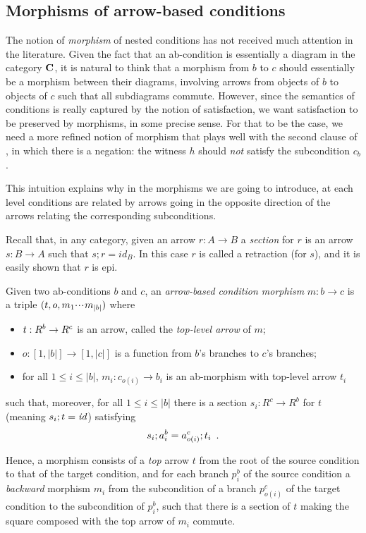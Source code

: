 \subsection{Morphisms of arrow-based conditions}

The notion of \emph{morphism} of nested conditions has not received much attention in the literature. Given the fact that an ab-condition is essentially a diagram in the category $\mathbf{C}$, it is natural to think that a morphism from $b$ to $c$ should essentially be a morphism between their diagrams, involving arrows from objects of $b$ to objects of $c$ such that all subdiagrams commute. However, since the semantics of conditions is really captured by the notion of satisfaction, we want satisfaction to be preserved by morphisms, in some precise sense. For that to be the case, we need a more refined notion of morphism that plays well with the second clause of , in which there is a negation: the witness $h$ should \emph{not} satisfy the subcondition $c_b$. 

This intuition explains why in the morphisms we are going to introduce, at each level conditions are related by arrows going in the opposite direction of the arrows relating the corresponding subconditions.  

Recall that, in any category, given an arrow $r: A \to B$ a \emph{section} for $r$ is an arrow $s: B \to A$ such that $s;r = id_B$. In this case $r$ is called a retraction (for $s$), and it is easily shown that $r$ is epi.

\begin{definition}
  Given two ab-conditions $b$ and $c$, an \emph{arrow-based condition morphism} $m: b \to c$ is a triple $(t,o,m_1{\cdotp\mkern-2mu\cdotp\mkern-2mu\cdotp\mkern1mu} m_{|b|})$ where
  \begin{itemize}
    \item $t:R^b\rightarrow R^c$ is an arrow, called the \emph{top-level arrow} of $m$;
	\item $o:[1,|b|]\to[1,|c|]$ is a function from $b$'s branches to $c$'s branches;
  \item for all $1\leq i\leq |b|$, $m_i:c_{o(i)}\to b_i$ is an ab-morphism with top-level arrow $t_i$
  \end{itemize}
such that, moreover, for all $1\leq i\leq |b|$ there is a section $s_i:R^c\to R^b$ for $t$ (meaning $s_i;t=\mathit{id}$) satisfying
\begin{equation}\eqlabel{ab-morphism}
s_i;a^b_i=a^c_{o(i)};t_i \enspace.
\end{equation}
\end{definition}
%
Hence, a morphism consists of a \emph{top} arrow $t$ from the root of the source condition to that of the target condition, and for each branch $p^b_i$ of the source condition a \emph{backward} morphism $m_i$ from the subcondition of a branch $p^c_{o(i)}$ of the target condition to the subcondition of $p^b_i$, such that there is a section of $t$ making the square composed with the top arrow of $m_i$ commute.

